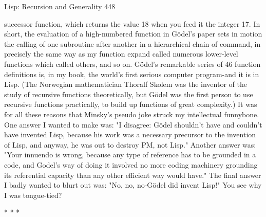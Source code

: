 Lisp: Recursion and Generality                                                        448

successor function, which returns the value 18 when you feed it the integer 17. In
short, the evaluation of a high-numbered function in Gödel’s paper sets in motion the
calling of one subroutine after another in a hierarchical chain of command, in
precisely the same way as my function expand called numerous lower-level functions
which called others, and so on. Gödel’s remarkable series of 46 function definitions
is, in my book, the world's first serious computer program-and it is in Lisp. (The
Norwegian mathematician Thoralf Skolem was the inventor of the study of recursive
functions theoretically, but Gödel was the first person to use recursive functions
practically, to build up functions of great complexity.)
        It was for all these reasons that Minsky's pseudo joke struck my intellectual
funnybone. One answer I wanted to make was: "I disagree: Gödel shouldn't have and
couldn't have invented Lisp, because his work was a necessary precursor to the
invention of Lisp, and anyway, he was out to destroy PM, not Lisp." Another answer
was: "Your innuendo is wrong, because any type of reference has to be grounded in a
code, and Godel's way of doing it involved no more coding machinery grounding its
referential capacity than any other efficient way would have." The final answer I
badly wanted to blurt out was: "No, no, no-Gödel did invent Lisp!" You see why I
was tongue-tied?

                                        *      *       *

